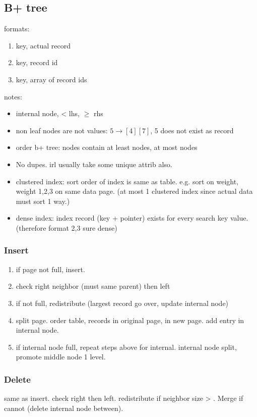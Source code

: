 \documentclass{article}
\begin{document}
\begin{multicols*}{4}
\subsection{B+ tree}
formats:
\begin{enumerate}
  \item key, actual record
  \item key, record id
  \item key, array of record ids
\end{enumerate}
notes:
\begin{itemize}
  \item internal node, < lhs, $\geq$ rhs
  \item non leaf nodes are not values: $5 \rightarrow [4][7]$, 5 does not exist as record
  \item order  b+ tree: nodes contain at least  nodes, at most  nodes
  \item No dupes. irl usually take some unique attrib also.
  \item clustered index: sort order of index is same as table. e.g. sort on weight, weight 1,2,3 on same data page. (at most 1 clustered index since actual data must sort 1 way.)
  \item dense index: index record (key + pointer) exists for every search key value. (therefore format 2,3 sure dense)
\end{itemize}

\subsubsection{Insert}
\begin{enumerate}
  \item if page not full, insert.
  \item check right neighbor (must same parent) then left
  \item if not full, redistribute (largest record go over, update internal node)
  \item split page. order  table,  records in original page,  in new page. add entry in internal node.
  \item if internal node full, repeat steps above for internal. internal node split, promote middle node 1 level.
\end{enumerate}

\subsubsection{Delete}
same as insert. check right then left. redistribute if neighbor size > . Merge if cannot (delete internal node between).


\end{multicols*}
\end{document}
